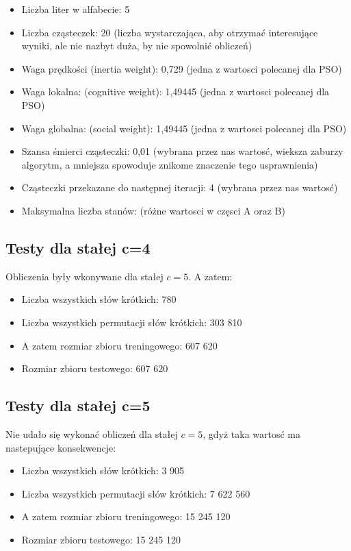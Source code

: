 \documentclass{../llncs_template_final/llncs}
\begin{document}
\begin{itemize}
\item Liczba liter w alfabecie: 5
\item Liczba cząsteczek: 20 (liczba wystarczająca, aby otrzymać interesujące wyniki, ale nie nazbyt duża, by nie spowolnić obliczeń)
\item Waga prędkości (inertia weight): 0,729 (jedna z wartosci polecanej dla PSO)
\item Waga lokalna: (cognitive weight): 1,49445 (jedna z wartosci polecanej dla PSO)
\item Waga globalna: (social weight): 1,49445	(jedna z wartosci polecanej dla PSO)
\item Szansa śmierci cząsteczki: 0,01 (wybrana przez nas wartosć, wieksza zaburzy algorytm, a mniejsza spowoduje znikome znaczenie tego usprawnienia)
\item Cząsteczki przekazane do następnej iteracji: 4 (wybrana przez nas wartosć)
\item Maksymalna liczba stanów: (różne wartosci w częsci A oraz B)
\end{itemize}

\subsection{Testy dla stałej c=4}
Obliczenia były wkonywane dla stałej $c = 5$. A zatem:
\begin{itemize}
\item Liczba wszystkich słów krótkich: 780
\item Liczba wszystkich permutacji słów krótkich: 303 810
\item A zatem rozmiar zbioru treningowego: 607 620
\item Rozmiar zbioru testowego: 607 620
\end{itemize}


\subsection{Testy dla stałej c=5}
Nie udało się wykonać obliczeń dla stałej $c = 5$, gdyż taka wartosć ma nastepujące konsekwencje:
\begin{itemize}
\item Liczba wszystkich słów krótkich: 3 905
\item Liczba wszystkich permutacji słów krótkich: 7 622 560
\item A zatem rozmiar zbioru treningowego: 15 245 120
\item Rozmiar zbioru testowego: 15 245 120
\end{itemize}
\end{document}
